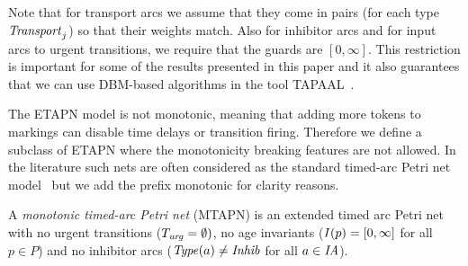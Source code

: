 \begin{remark}
Note that for transport arcs we assume that they come in pairs (for
each type $\mathit{Transport}_j$) so that their weights match.
Also for inhibitor arcs and for input arcs to urgent transitions, we
require that the guards are $[0,\infty]$. This restriction is important
for some of the results presented in this paper and it also guarantees that 
we can use DBM-based algorithms in the tool TAPAAL~\cite{DJJJMS:TACAS:12}.
\end{remark}

The ETAPN model is not monotonic, meaning
that adding more tokens to markings can disable time delays or
transition firing.
Therefore we define a subclass of 
ETAPN where the monotonicity breaking features are not allowed.
In the literature such nets are often considered as the standard
timed-arc Petri net model~\cite{BLT:90,Hanisch:93} but we add the 
prefix monotonic for clarity reasons. 

\begin{definition} \label{deftapn}
A \emph{monotonic timed-arc Petri net} 
(MTAPN) is an extended timed arc Petri net 
with no urgent transitions ($T_{\mathit{urg}}=\emptyset)$, no age invariants
($\mathit{I}(p) = [0,\infty]$ for all $p \in P$) and no 
inhibitor arcs ($\mathit{Type}(a) \not= \mathit{Inhib}$ for all $a \in \mathit{IA}$).
\end{definition}



